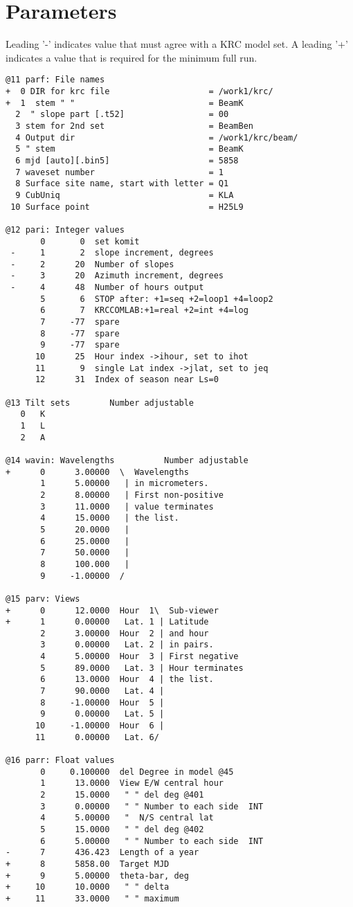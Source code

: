 \documentclass{article}
\begin{document}
\section{Parameters}
Leading '-' indicates value that must agree with a KRC model set. A leading '+' indicates a value that is required for the minimum full run.
\vspace{-3.mm} 
\begin{verbatim}
@11 parf: File names
+  0 DIR for krc file                    = /work1/krc/
+  1  stem " "                           = BeamK
  2  " slope part [.t52]                 = 00
  3 stem for 2nd set                     = BeamBen
  4 Output dir                           = /work1/krc/beam/
  5 " stem                               = BeamK
  6 mjd [auto][.bin5]                    = 5858
  7 waveset number                       = 1
  8 Surface site name, start with letter = Q1
  9 CubUniq                              = KLA
 10 Surface point                        = H25L9

@12 pari: Integer values
       0       0  set komit
 -     1       2  slope increment, degrees
 -     2      20  Number of slopes
 -     3      20  Azimuth increment, degrees
 -     4      48  Number of hours output
       5       6  STOP after: +1=seq +2=loop1 +4=loop2
       6       7  KRCCOMLAB:+1=real +2=int +4=log
       7     -77  spare
       8     -77  spare
       9     -77  spare
      10      25  Hour index ->ihour, set to ihot
      11       9  single Lat index ->jlat, set to jeq
      12      31  Index of season near Ls=0

@13 Tilt sets        Number adjustable
   0   K
   1   L
   2   A

@14 wavin: Wavelengths          Number adjustable
+      0      3.00000  \  Wavelengths
       1      5.00000   | in micrometers.
       2      8.00000   | First non-positive
       3      11.0000   | value terminates
       4      15.0000   | the list.
       5      20.0000   |
       6      25.0000   |
       7      50.0000   |
       8      100.000   |
       9     -1.00000  /

@15 parv: Views                  
+      0      12.0000  Hour  1\  Sub-viewer
+      1      0.00000   Lat. 1 | Latitude
       2      3.00000  Hour  2 | and hour
       3      0.00000   Lat. 2 | in pairs.
       4      5.00000  Hour  3 | First negative
       5      89.0000   Lat. 3 | Hour terminates
       6      13.0000  Hour  4 | the list.
       7      90.0000   Lat. 4 | 
       8     -1.00000  Hour  5 | 
       9      0.00000   Lat. 5 | 
      10     -1.00000  Hour  6 | 
      11      0.00000   Lat. 6/

@16 parr: Float values 
       0     0.100000  del Degree in model @45
       1      13.0000  View E/W central hour
       2      15.0000   " " del deg @401
       3      0.00000   " " Number to each side  INT
       4      5.00000   "  N/S central lat
       5      15.0000   " " del deg @402
       6      5.00000   " " Number to each side  INT
-      7      436.423  Length of a year
+      8      5858.00  Target MJD
+      9      5.00000  theta-bar, deg
+     10      10.0000   " " delta
+     11      33.0000   " " maximum
\end{verbatim}  
\end{document}
